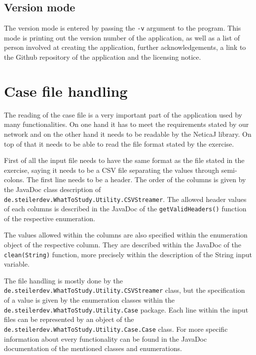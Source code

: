 \documentclass[%
	pdftex,
	oneside,        %
	11pt,           %
	parskip=half,   %
	headsepline,    %
	footsepline,    %
	abstracton,     %
	USenglish,      %
	a4paper,        %
]{report}
\begin{document}
\subsection{Version mode}
The version mode is entered by passing the \texttt{-v} argument to the program. This mode is printing out the version number of the application, as well as a list of person involved at creating the application, further acknowledgements, a link to the Github repository of the application and the licensing notice.

\section{Case file handling}
\label{sec:CaseFile}
The reading of the case file is a very important part of the application used by many functionalities. On one hand it has to meet the requirements stated by our network and on the other hand it needs to be readable by the NeticaJ library. On top of that it needs to be able to read the file format stated by the exercise. 

First of all the input file needs to have the same format as the file stated in the exercise, saying it needs to be a CSV file separating the values through semi-colons. The first line needs to be a header. The order of the columns is given by the JavaDoc class description of \texttt{de.\allowbreak steilerdev.\allowbreak WhatToStudy.\allowbreak Utility.\allowbreak CSVStreamer}. The allowed header values of each columns is described in the JavaDoc of the \texttt{getValidHeaders()} function of the respective enumeration.

The values allowed within the columns are also specified within the enumeration object of the respective column. They are described within the JavaDoc of the \texttt{clean(String)} function, more precisely within the description of the String input variable.

The file handling is mostly done by the \texttt{de.\allowbreak steilerdev.\allowbreak WhatToStudy.\allowbreak Utility.\allowbreak CSVStreamer} class, but the specification of a value is given by the enumeration classes within the \texttt{de.\allowbreak steilerdev.\allowbreak WhatToStudy.\allowbreak Utility.\allowbreak Case} package. Each line within the input files can be represented by an object of the \texttt{de.\allowbreak steilerdev.\allowbreak WhatToStudy.\allowbreak Utility.\allowbreak Case.\allowbreak Case} class. For more specific information about every functionality can be found in the JavaDoc documentation of the mentioned classes and enumerations.

\printbibliography

\begin{appendices}
    
    
\end{appendices}
\end{document}
